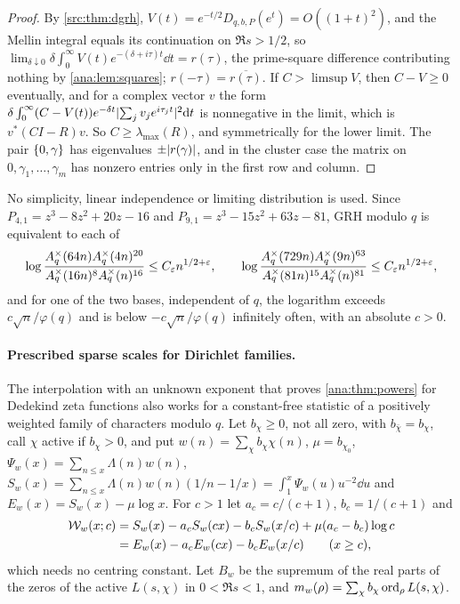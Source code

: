 \begin{proof}
By \cref{src:thm:dgrh}, $V(t)=e^{-t/2}D_{q,b,P}(e^t)=O((1+t)^2)$, and the Mellin integral
equals its continuation on $\Re s>1/2$, so
$\lim_{\delta\downarrow0}\delta\int_0^\infty V(t)e^{-(\delta+i\tau)t}\dd t=r(\tau)$, the
prime-square difference contributing nothing by \cref{ana:lem:squares}; $r(-\tau)=\overline{r(\tau)}$.
If $C>\limsup V$, then $C-V\ge0$ eventually, and for a complex vector $v$ the form
$\delta\int_0^\infty(C-V(t))e^{-\delta t}\lvert\sum_jv_je^{i\tau_jt}\rvert^2\mathrm{d} t$ is nonnegative in
the limit, which is $v^*(CI-R)v$. So $C\ge\lambda_{\max}(R)$, and symmetrically for the lower
limit. The pair $\{0,\gamma\}$ has eigenvalues $\pm\lvert r(\gamma)\rvert$, and in the cluster case the
matrix on $0,\gamma_1,\dots,\gamma_m$ has nonzero entries only in the first row and column.
\end{proof}

No simplicity, linear independence or limiting distribution is used. Since
$P_{4,1}=z^3-8z^2+20z-16$ and $P_{9,1}=z^3-15z^2+63z-81$, GRH modulo $q$ is equivalent to
each of
\[
 \log\frac{A_q^\times(64n)A_q^\times(4n)^{20}}{A_q^\times(16n)^8A_q^\times(n)^{16}}\le C_\varepsilon n^{1/2+\varepsilon},\qquad
 \log\frac{A_q^\times(729n)A_q^\times(9n)^{63}}{A_q^\times(81n)^{15}A_q^\times(n)^{81}}\le C_\varepsilon n^{1/2+\varepsilon},
\]
and for one of the two bases, independent of $q$, the logarithm exceeds $c\sqrt n/\varphi(q)$
and is below $-c\sqrt n/\varphi(q)$ infinitely often, with an absolute $c>0$.

\paragraph{Prescribed sparse scales for Dirichlet families.}
The interpolation with an unknown exponent that proves \cref{ana:thm:powers} for Dedekind zeta
functions also works for a constant-free statistic of a positively weighted family of
characters modulo $q$. Let $b_\chi\ge0$, not all zero, with
$b_{\bar\chi}=b_\chi$, call $\chi$ active if $b_\chi>0$, and put $w(n)=\sum_\chi b_\chi\chi(n)$,
$\mu=b_{\chi_0}$, $\Psi_w(x)=\sum_{n\le x}\Lambda(n)w(n)$,
$S_w(x)=\sum_{n\le x}\Lambda(n)w(n)(1/n-1/x)=\int_1^x\Psi_w(u)u^{-2}\dd u$ and
$E_w(x)=S_w(x)-\mu\log x$. For $c>1$ let $a_c=c/(c+1)$, $b_c=1/(c+1)$ and
\begin{equation}\label{ana:eq:balanced}
\begin{split}
 \mathcal{W}_w(x;c)&=S_w(x)-a_cS_w(cx)-b_cS_w(x/c)+\mu(a_c-b_c)\log c\\
 &=E_w(x)-a_cE_w(cx)-b_cE_w(x/c)\qquad(x\ge c),
\end{split}
\end{equation}
which needs no centring constant. Let $B_w$ be the supremum of the real parts of the zeros of
the active $L(s,\chi)$ in $0<\Re s<1$, and $m_w(\rho)=\sum_\chi b_\chi\operatorname{ord}_\rho L(s,\chi)$.

